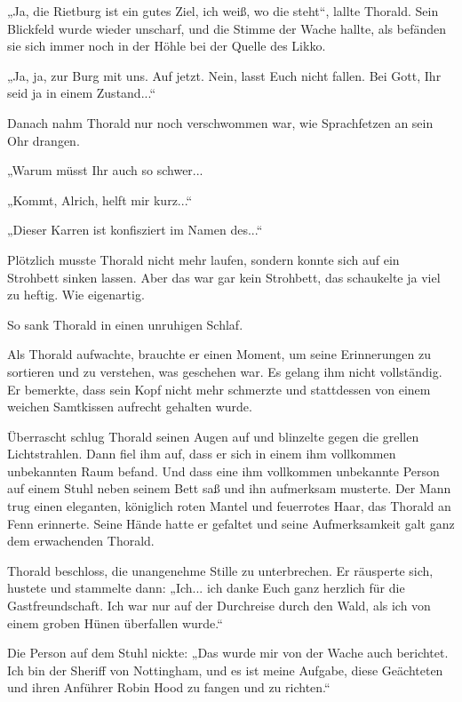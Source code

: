 \documentclass[10pt, a4paper, oneside]{book}
\begin{document}
„Ja, die Rietburg ist ein gutes Ziel, ich weiß, wo die steht“, lallte Thorald. Sein Blickfeld wurde wieder unscharf, und die Stimme der Wache hallte, als befänden sie sich immer noch in der Höhle bei der Quelle des Likko.

„Ja, ja, zur Burg mit uns. Auf jetzt. Nein, lasst Euch nicht fallen. Bei Gott, Ihr seid ja in einem Zustand...“

Danach nahm Thorald nur noch verschwommen war, wie Sprachfetzen an sein Ohr drangen.

„Warum müsst Ihr auch so schwer...

„Kommt, Alrich, helft mir kurz...“

„Dieser Karren ist konfisziert im Namen des...“

Plötzlich musste Thorald nicht mehr laufen, sondern konnte sich auf ein Strohbett sinken lassen. Aber das war gar kein Strohbett, das schaukelte ja viel zu heftig. Wie eigenartig.

So sank Thorald in einen unruhigen Schlaf.\bigskip







Als Thorald aufwachte, brauchte er einen Moment, um seine Erinnerungen zu sortieren und zu verstehen, was geschehen war. Es gelang ihm nicht vollständig. Er bemerkte, dass sein Kopf nicht mehr schmerzte und stattdessen von einem weichen Samtkissen aufrecht gehalten wurde.

Überrascht schlug Thorald seinen Augen auf und blinzelte gegen die grellen Lichtstrahlen. Dann fiel ihm auf, dass er sich in einem ihm vollkommen unbekannten Raum befand. Und dass eine ihm vollkommen unbekannte Person auf einem Stuhl neben seinem Bett saß und ihn aufmerksam musterte. Der Mann trug einen eleganten, königlich roten Mantel und feuerrotes Haar, das Thorald an Fenn erinnerte. Seine Hände hatte er gefaltet und seine Aufmerksamkeit galt ganz dem erwachenden Thorald.

Thorald beschloss, die unangenehme Stille zu unterbrechen. Er räusperte sich, hustete und stammelte dann: „Ich... ich danke Euch ganz herzlich für die Gastfreundschaft. Ich war nur auf der Durchreise durch den Wald, als ich von einem groben Hünen überfallen wurde.“

Die Person auf dem Stuhl nickte: „Das wurde mir von der Wache auch berichtet. Ich bin der Sheriff von Nottingham, und es ist meine Aufgabe, diese Geächteten und ihren Anführer Robin Hood zu fangen und zu richten.“
\end{document}
